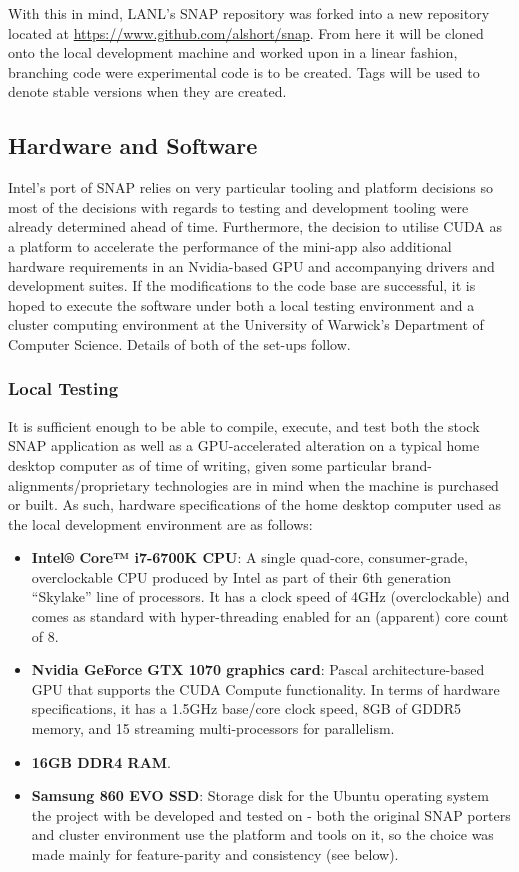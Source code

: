 \documentclass[conference]{IEEEtran}
\begin{document}
With this in mind, LANL's SNAP repository was forked into a new repository located at \url{https://www.github.com/alshort/snap}. From here it will be cloned onto the local development machine and worked upon in a linear fashion, branching code were experimental code is to be created. Tags will be used to denote stable versions when they are created.


\subsection{Hardware and Software}

Intel's port of SNAP relies on very particular tooling and platform decisions so most of the decisions with regards to testing and development tooling were already determined ahead of time. Furthermore, the decision to utilise CUDA as a platform to accelerate the performance of the mini-app also additional hardware requirements in an Nvidia-based GPU and accompanying drivers and development suites. If the modifications to the code base are successful, it is hoped to execute the software under both a local testing environment and a cluster computing environment at the University of Warwick's Department of Computer Science. Details of both of the set-ups follow.

\subsubsection{Local Testing}

It is sufficient enough to be able to compile, execute, and test both the stock SNAP application as well as a GPU-accelerated alteration on a typical home desktop computer as of time of writing, given some particular brand-alignments/proprietary technologies are in mind when the machine is purchased or built. As such, hardware specifications of the home desktop computer used as the local development environment are as follows:

\begin{itemize}
    \item \textbf{Intel® Core™ i7-6700K CPU}: A single quad-core, consumer-grade, overclockable CPU produced by Intel as part of their 6th generation ``Skylake'' line of processors. It has a clock speed of 4GHz (overclockable) and comes as standard with hyper-threading enabled for an (apparent) core count of 8.
    \item \textbf{Nvidia GeForce GTX 1070 graphics card}: Pascal architecture-based GPU that supports the CUDA Compute functionality. In terms of hardware specifications, it has a 1.5GHz base/core clock speed, 8GB of GDDR5 memory, and 15 streaming multi-processors for parallelism.
    \item \textbf{16GB DDR4 RAM}.
    \item \textbf{Samsung 860 EVO SSD}: Storage disk for the Ubuntu operating system the project with be developed and tested on - both the original SNAP porters and cluster environment use the platform and tools on it, so the choice was made mainly for feature-parity and consistency (see below).
\end{itemize}
\end{document}
